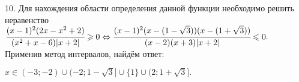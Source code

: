 10. Для нахождения области определения данной функции необходимо решить неравенство\\ $\cfrac{(x-1)^2(2x-x^2+2)}{(x^2+x-6)|x+2|}\geqslant0\Leftrightarrow
\cfrac{(x-1)^2(x-(1-\sqrt{3}))(x-(1+\sqrt{3}))}{(x-2)(x+3)|x+2|}\leqslant0.$ Применив метод интервалов, найдём ответ:
\begin{figure}[ht!]
\end{figure}
$x\in(-3;-2)\cup(-2;1-\sqrt{3}]\cup\{1\}\cup(2;1+\sqrt{3}].$\\
